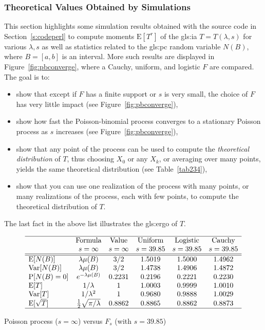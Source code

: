 \documentclass[10pt]{article}
\begin{document}
\subsubsection{Theoretical Values Obtained by Simulations}

This section highlights some simulation results obtained with the source code in Section~\ref{s:codeperl} to compute moments $\mbox{E}[T^r]$
of the \gls{gls:ia} $T=T(\lambda,s)$ for various $\lambda,s$ as well as statistics related to the 
\gls{gls:pc} random variable $N(B)$, where 
$B=[a,b]$ is an interval.  More such results are displayed in Figure~\ref{fig:pbconverge}, where a Cauchy, uniform, and logistic $F$ are compared.   The goal is to: 
\begin{itemize}
\item show that except if $F$ has a finite support or $s$ is very small, the choice of $F$ has very little impact (see Figure~\ref{fig:pbconverge}),
\item show how fast the Poisson-binomial process converges to a stationary Poisson process as $s$ increases (see Figure~\ref{fig:pbconverge}),
\item show that any point of the process can be used to compute the {\em theoretical distribution} of $T$, thus choosing $X_0$ or any $X_k$, or averaging over many points, yields the same theoretical distribution (see Table~\ref{tab234}),
\item show that you can use one realization of the process with many points, or many realizations of the process, each with few points,
to compute the theoretical distribution of $T$.
\end{itemize}
\noindent The last fact in the above list illustrates the \gls{gls:ergo} of $T$.

\begin{table}[H]
\[
\begin{array}{lccccc}
\hline
   & \mbox{Formula} & \mbox{Value} & \mbox{Uniform} & \mbox{Logistic} & \mbox{Cauchy}  \\
  &  s=\infty & s=\infty & s=39.85 & s=39.85 & s=39.85  \\
\hline
\hline
\mbox{E}[N(B)]    &  \lambda \mu(B)&  3/2 &  1.5019  & 1.5000 & 1.4962  \\
\mbox{Var}[N(B)]   &  \lambda \mu(B) & 3/2 & 1.4738 & 1.4906 & 1.4872   \\
\mbox{P}[N(B)=0]   & e^{-\lambda \mu(B)} & 0.2231  &   0.2196 & 0.2221 & 0.2230 \\
\mbox{E}[T]   &  1/\lambda & 1 & 1.0003 & 0.9999 & 1.0010  \\
 \mbox{Var}[T]  & 1/\lambda^2 & 1 &  0.9680 & 0.9888  & 1.0029  \\
\mbox{E}[\sqrt{T}]   & \frac{1}{2} \sqrt{\pi/\lambda} & 0.8862 &   0.8865 & 0.8862 & 0.8873\\
\hline
\end{array}
\]
\caption{\label{tab124}Poisson process ($s=\infty$) versus $F_s$ (with $s=39.85$)}
\end{table}
\end{document}
